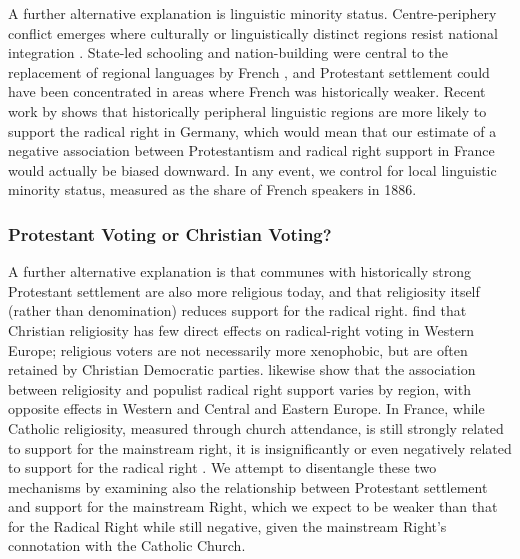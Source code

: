 \documentclass[12pt]{article}
\begin{document}
A further alternative explanation is linguistic minority status. Centre-periphery conflict emerges where culturally or linguistically distinct regions resist national integration \parencite{lipsetCleavageStructuresParty1967}. State-led schooling and nation-building were central to the replacement of regional languages by French \parencite{weberPeasantsFrenchmenModernization1976a}, and Protestant settlement could have been concentrated in areas where French was historically weaker. Recent work by \textcite{ziblattWealthTonguesWhy2023} shows that historically peripheral linguistic regions are more likely to support the radical right in Germany, which would mean that our estimate of a negative association between Protestantism and radical right support in France would actually be biased downward. In any event, we control for local linguistic minority status, measured as the share of French speakers in 1886.

\subsubsection{Protestant Voting or Christian Voting?}

A further alternative explanation is that communes with historically strong Protestant settlement are also more religious today, and that religiosity itself (rather than denomination) reduces support for the radical right. \textcite{arzheimerChristianReligiosityVoting2009} find that Christian religiosity has few direct effects on radical-right voting in Western Europe; religious voters are not necessarily more xenophobic, but are often retained by Christian Democratic parties. \textcite{marcinkiewiczReligiousVotersSupport2022} likewise show that the association between religiosity and populist radical right support varies by region, with opposite effects in Western and Central and Eastern Europe. In France, while Catholic religiosity, measured through church attendance, is still strongly related to support for the mainstream right, it is insignificantly or even negatively related to support for the radical right \parencite{lewis-beck2004, boyLelecteurSesRaisons1997a, mayerFrontNationalVote1998, michelatSystemeSymboliqueCatholique2015, overosDieuDansCommune2023}. We attempt to disentangle these two mechanisms by examining also the relationship between Protestant settlement and support for the mainstream Right, which we expect to be weaker than that for the Radical Right while still negative, given the mainstream Right's connotation with the Catholic Church.
\end{document}
